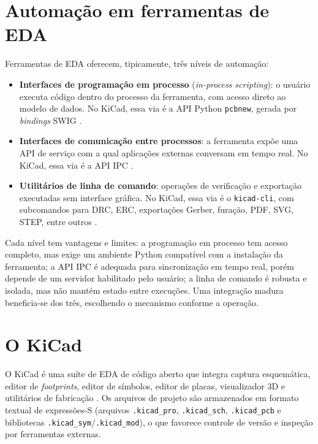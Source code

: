 \section{Automação em ferramentas de EDA}

Ferramentas de EDA oferecem, tipicamente, três níveis de automação:

\begin{itemize}[leftmargin=1.4em,itemsep=0.2em]
  \item \textbf{Interfaces de programação em processo} (\emph{in-process
        scripting}): o usuário executa código dentro do processo da ferramenta,
        com acesso direto ao modelo de dados. No KiCad, essa via é a API
        Python \texttt{pcbnew}, gerada por \emph{bindings} SWIG
        \citep{swig}.
  \item \textbf{Interfaces de comunicação entre processos}: a ferramenta expõe
        uma API de serviço com a qual aplicações externas conversam em tempo
        real. No KiCad, essa via é a API IPC \citep{kicaddev}.
  \item \textbf{Utilitários de linha de comando}: operações de verificação e
        exportação executadas sem interface gráfica. No KiCad, essa via é o
        \texttt{kicad-cli}, com subcomandos para DRC, ERC, exportações Gerber,
        furação, PDF, SVG, STEP, entre outros \citep{kicadcli}.
\end{itemize}

Cada nível tem vantagens e limites: a programação em processo tem acesso
completo, mas exige um ambiente Python compatível com a instalação da
ferramenta; a API IPC é adequada para sincronização em tempo real, porém
depende de um servidor habilitado pelo usuário; a linha de comando é robusta e
isolada, mas não mantém estado entre execuções. Uma integração madura
beneficia-se dos três, escolhendo o mecanismo conforme a operação.

\section{O KiCad}

O KiCad é uma suíte de EDA de código aberto que integra captura esquemática,
editor de \emph{footprints}, editor de símbolos, editor de placas, visualizador
3D e utilitários de fabricação \citep{kicaddocs}. Os arquivos de projeto são
armazenados em formato textual de expressões-S (arquivos
\texttt{.kicad\_pro}, \texttt{.kicad\_sch}, \texttt{.kicad\_pcb} e bibliotecas
\texttt{.kicad\_sym}/\texttt{.kicad\_mod}), o que favorece controle de versão
e inspeção por ferramentas externas.

